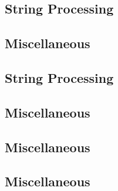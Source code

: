 \vspace{-.7\baselineskip}\hrulefill
\vspace{0.1\baselineskip}\subsection{String Processing}
\raggedbottom
\vspace{-.7\baselineskip}\hrulefill
\vspace{0.1\baselineskip}\subsection{Miscellaneous}
\raggedbottom
\vspace{-.7\baselineskip}\hrulefill
\vspace{0.1\baselineskip}\subsection{String Processing}
\raggedbottom
\vspace{-.7\baselineskip}\hrulefill
\vspace{0.1\baselineskip}\subsection{Miscellaneous}
\raggedbottom
\vspace{-.7\baselineskip}\hrulefill
\vspace{0.1\baselineskip}\subsection{Miscellaneous}
\raggedbottom
\vspace{-.7\baselineskip}\hrulefill
\vspace{0.1\baselineskip}\subsection{Miscellaneous}
\raggedbottom
